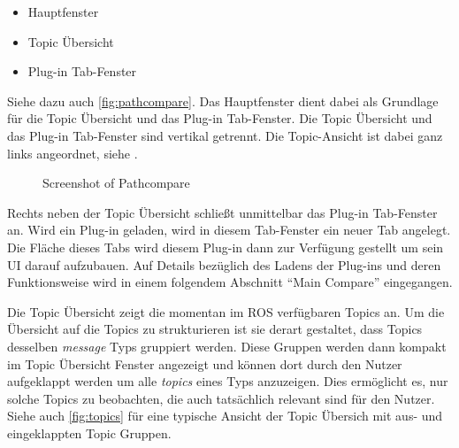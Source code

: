 \begin{itemize}
\item Hauptfenster
\item Topic Übersicht
\item Plug-in Tab-Fenster
\end{itemize}

Siehe dazu auch \autoref{fig:pathcompare}.
Das Hauptfenster dient dabei als Grundlage für die Topic Übersicht und das
Plug-in Tab-Fenster. Die Topic Übersicht und das Plug-in Tab-Fenster sind vertikal
getrennt. Die Topic-Ansicht ist dabei ganz links angeordnet, siehe   .

\begin{figure}[t]
  \begin{center}
  \end{center}
  \caption{Screenshot of Pathcompare}
  \label{fig:pathcompare}
\end{figure}

Rechts neben der Topic Übersicht schließt unmittelbar das Plug-in Tab-Fenster
an. Wird ein Plug-in geladen, wird in diesem Tab-Fenster ein neuer Tab
angelegt. Die Fläche dieses Tabs wird diesem Plug-in dann zur Verfügung
gestellt um sein UI darauf aufzubauen. Auf Details bezüglich des Ladens der
Plug-ins und deren Funktionsweise wird in einem folgendem Abschnitt ``Main
Compare'' eingegangen. 

Die Topic Übersicht zeigt die momentan im ROS verfügbaren Topics an. 
Um die Übersicht auf die Topics zu strukturieren ist sie derart
gestaltet, dass Topics desselben \textit{message} Typs gruppiert werden. Diese
Gruppen werden dann kompakt im Topic Übersicht Fenster angezeigt und können dort durch
den Nutzer aufgeklappt werden um alle \textit{topics} eines Typs anzuzeigen.
Dies ermöglicht es, nur solche Topics zu beobachten, die auch
tatsächlich relevant sind für den Nutzer. 
Siehe auch \autoref{fig:topics} für eine typische Ansicht der Topic Übersich mit aus- und
eingeklappten Topic Gruppen.


